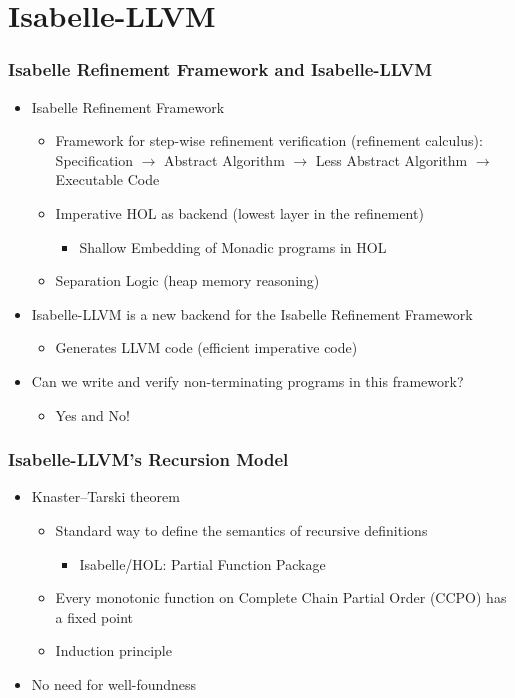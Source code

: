 \documentclass[aspectratio=169,10pt]{beamer}
\begin{document}
\section{Isabelle-LLVM}

\begin{frame}[fragile]
  \frametitle{Isabelle Refinement Framework and Isabelle-LLVM}
  \begin{itemize}
    \item Isabelle Refinement Framework
          \begin{itemize}
            \item Framework for step-wise refinement verification (refinement calculus): Specification $\rightarrow$ Abstract Algorithm $\rightarrow$ Less Abstract Algorithm $\rightarrow$ Executable Code
            \item Imperative HOL as backend (lowest layer in the refinement)
                  \begin{itemize}
                    \item Shallow Embedding of Monadic programs in HOL
                  \end{itemize}
            \item Separation Logic (heap memory reasoning)
          \end{itemize}
    \item Isabelle-LLVM is a new backend for the Isabelle Refinement Framework
          \begin{itemize}
            \item Generates LLVM code (efficient imperative code)
          \end{itemize}
          \pause
    \item Can we write and verify non-terminating programs in this framework?
          \pause
          \begin{itemize}
            \item Yes and No!
          \end{itemize}
  \end{itemize}
\end{frame}

\begin{frame}[fragile]
  \frametitle{Isabelle-LLVM's Recursion Model}
  \begin{itemize}
    \item Knaster–Tarski theorem
          \begin{itemize}
            \item Standard way to define the semantics of recursive definitions
                  \begin{itemize}
                    \item Isabelle/HOL: Partial Function Package
                  \end{itemize}
            \item Every monotonic function on Complete Chain Partial Order (CCPO) has a fixed point
            \item Induction principle
          \end{itemize}
    \item No need for well-foundness
  \end{itemize}
\end{frame}
\end{document}
